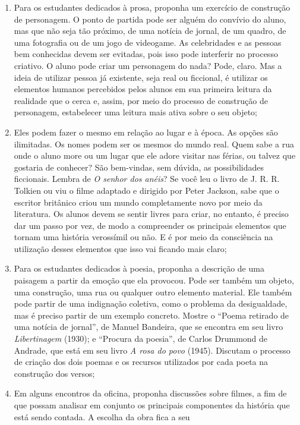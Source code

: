 \documentclass[12pt]{extarticle}
\begin{document}
\begin{enumerate}
\item
  Para os estudantes dedicados à prosa, proponha um exercício de
  construção de personagem. O ponto de partida pode ser alguém do
  convívio do aluno, mas que não seja tão próximo, de uma notícia de
  jornal, de um quadro, de uma fotografia ou de um jogo de videogame. As
  celebridades e as pessoas bem conhecidas devem ser evitadas, pois isso
  pode interferir no processo criativo. O aluno pode criar um personagem
  do nada? Pode, claro. Mas a ideia de utilizar pessoa já existente,
  seja real ou ficcional, é utilizar os elementos humanos percebidos
  pelos alunos em sua primeira leitura da realidade que o cerca e,
  assim, por meio do processo de construção de personagem, estabelecer
  uma leitura mais ativa sobre o seu objeto;
\item
  Eles podem fazer o mesmo em relação ao lugar e à época. As opções são
  ilimitadas. Os nomes podem ser os mesmos do mundo real. Quem sabe a
  rua onde o aluno more ou um lugar que ele adore visitar nas férias, ou
  talvez que gostaria de conhecer? São bem-vindas, sem dúvida, as
  possibilidades ficcionais. Lembra de \emph{O senhor dos anéis}? Se
  você leu o livro de J. R. R. Tolkien ou viu o filme adaptado e
  dirigido por Peter Jackson, sabe que o escritor britânico criou um
  mundo completamente novo por meio da literatura. Os alunos devem se
  sentir livres para criar, no entanto, é preciso dar um passo por vez,
  de modo a compreender os principais elementos que tornam uma história
  verossímil ou não. E é por meio da consciência na utilização desses
  elementos que isso vai ficando mais claro;
\item
  Para os estudantes dedicados à poesia, proponha a descrição de uma
  paisagem a partir da emoção que ela provocou. Pode ser também um
  objeto, uma construção, uma rua ou qualquer outro elemento material.
  Ele também pode partir de uma indignação coletiva, como o problema da
  desigualdade, mas é preciso partir de um exemplo concreto. Mostre o
  ``Poema retirado de uma notícia de jornal'', de Manuel Bandeira, que
  se encontra em seu livro \emph{Libertinagem} (1930); e ``Procura da
  poesia'', de Carlos Drummond de Andrade, que está em seu livro \emph{A
  rosa do povo} (1945). Discutam o processo de criação dos dois poemas e
  os recursos utilizados por cada poeta na construção dos versos;
\item
  Em alguns encontros da oficina, proponha discussões sobre filmes, a
  fim de que possam analisar em conjunto os principais componentes da
  história que está sendo contada. A escolha da obra fica a seu

\end{enumerate}
\end{document}
